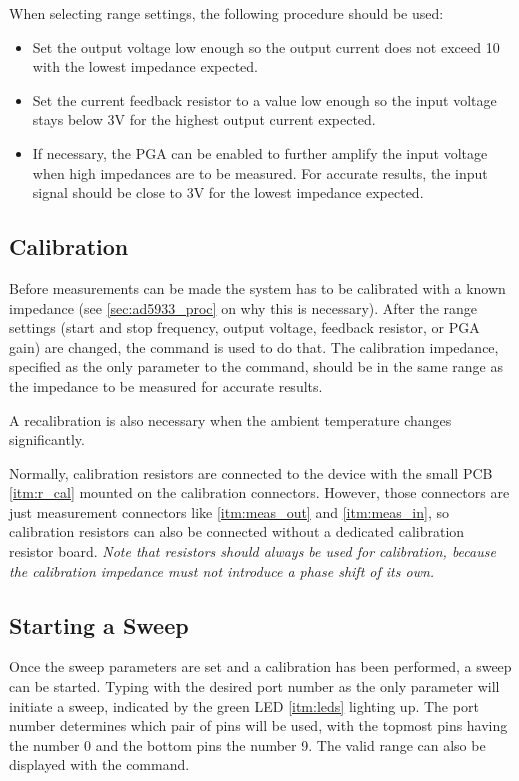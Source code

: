 When selecting range settings, the following procedure should be used:
\begin{itemize}
	\item Set the output voltage low enough so the output current does not exceed \unit{10}{\milli\ampere} with the
    lowest impedance expected.
  \item Set the current feedback resistor to a value low enough so the input voltage stays below 3V for the highest
    output current expected.
  \item If necessary, the PGA can be enabled to further amplify the input voltage when high impedances are to be
    measured. For accurate results, the input signal should be close to 3V for the lowest impedance expected.
\end{itemize}

\subsection{Calibration}

Before measurements can be made the system has to be calibrated with a known impedance (see \autoref{sec:ad5933_proc}
on why this is necessary). After the range settings (start and stop frequency, output voltage, feedback resistor, or
PGA gain) are changed, the  command is used to do that. The calibration impedance, specified
as the only parameter to the command, should be in the same range as the impedance to be measured for accurate results.

A recalibration is also necessary when the ambient temperature changes significantly.

Normally, calibration resistors are connected to the device with the small PCB \ref{itm:r_cal} mounted on the
calibration connectors. However, those connectors are just measurement connectors like \ref{itm:meas_out} and
\ref{itm:meas_in}, so calibration resistors can also be connected without a dedicated calibration resistor board.
\emph{Note that resistors should always be used for calibration, because the calibration impedance must not introduce
  a phase shift of its own.}

\subsection{Starting a Sweep}

Once the sweep parameters are set and a calibration has been performed, a sweep can be started.
Typing  with the desired port number as the only parameter will initiate a sweep, indicated by
the green LED \ref{itm:leds} lighting up. The port number determines which pair of pins will be used, with the topmost
pins having the number 0 and the bottom pins the number 9. The valid range can also be displayed with the
 command.

